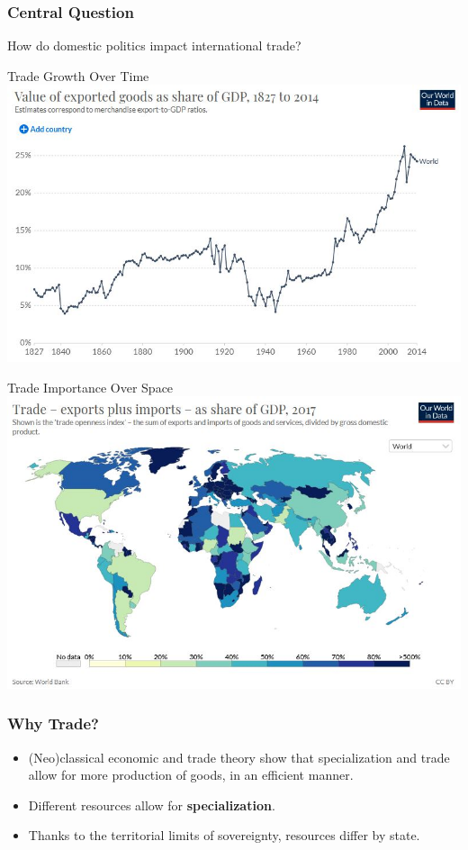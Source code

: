 \documentclass[handout]{beamer}
\begin{document}
\begin{frame} 
	\frametitle{\LARGE{Central Question}}
	\centering
	\Large{How do domestic politics impact international trade?}
\end{frame}

\begin{frame}{\LARGE Trade Growth Over Time}
    \centering
\includegraphics[width=\textwidth,height=0.8\textheight,keepaspectratio]{world export values.JPG}
\end{frame}

\begin{frame}{\LARGE Trade Importance Over Space}
    \centering
\includegraphics[width=\textwidth,height=0.8\textheight,keepaspectratio]{imports plus exports.JPG}
\end{frame}

\begin{frame} 
	\frametitle{\LARGE Why Trade?}
	\begin{itemize}
			\item (Neo)classical economic and trade theory show that specialization and trade  allow for more production of goods, in an efficient manner. \pause
			\item Different resources allow for \textbf{specialization}.
			\item Thanks to the territorial limits of sovereignty, resources differ by state.
	\end{itemize}
\end{frame}
\end{document}
